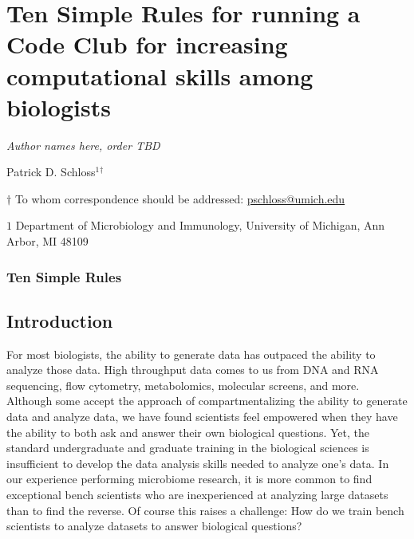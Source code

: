 \documentclass[
  11pt,
]{article}
\author{}
\date{\vspace{-2.5em}}
\begin{document}
\vspace{10mm}

\hypertarget{ten-simple-rules-for-running-a-code-club-for-increasing-computational-skills-among-biologists}{%
\section{Ten Simple Rules for running a Code Club for increasing
computational skills among
biologists}\label{ten-simple-rules-for-running-a-code-club-for-increasing-computational-skills-among-biologists}}

\vspace{35mm}

\emph{Author names here, order TBD}

Patrick D. Schloss\({^1}\)\({^\dagger}\)

\vspace{40mm}

\(\dagger\) To whom correspondence should be addressed:
\href{mailto:pschloss@umich.edu}{pschloss@umich.edu}

\(1\) Department of Microbiology and Immunology, University of Michigan,
Ann Arbor, MI 48109

\vspace{35mm}

\hypertarget{ten-simple-rules}{%
\subsubsection{Ten Simple Rules}\label{ten-simple-rules}}

\newpage
\linenumbers

\hypertarget{introduction}{%
\subsection{Introduction}\label{introduction}}

For most biologists, the ability to generate data has outpaced the
ability to analyze those data. High throughput data comes to us from DNA
and RNA sequencing, flow cytometry, metabolomics, molecular screens, and
more. Although some accept the approach of compartmentalizing the
ability to generate data and analyze data, we have found scientists feel
empowered when they have the ability to both ask and answer their own
biological questions. Yet, the standard undergraduate and graduate
training in the biological sciences is insufficient to develop the data
analysis skills needed to analyze one's data. In our experience
performing microbiome research, it is more common to find exceptional
bench scientists who are inexperienced at analyzing large datasets than
to find the reverse. Of course this raises a challenge: How do we train
bench scientists to analyze datasets to answer biological questions?
\end{document}
